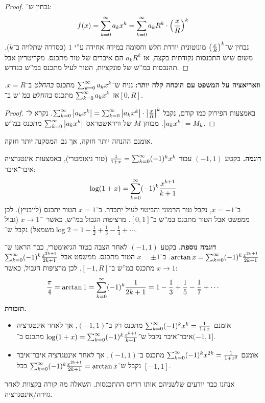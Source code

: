 \documentclass[]{../../../../tex/classes/styledArticle}
\begin{document}
	\begin{proof}
		נבחין ש־: 
		\[ f(x) = \sum_{k = 0}^{\infty} a_kx^{k} = \sum_{k = 0}^{\infty} a_kR^{k} \cdot \left ( \frac{x}{R} \right )^{k} \]
	נבחין ש־$\left ( \frac{x}{R} \right )^{k}$ מונוטונית יורדת חלש וחסומה במידה אחידה ע''י $1$ (כסדרה שתלויה ב־$k$). משום שיש התכנסות נקודתית בקצה, אז $a_kR^{k}$ הם איברים של טור מתכנס. מקריטריון אבל תהנכסות במ''ש של פונקציות, הטור לעיל מתכנס במ''ש כנדרש. 
	\end{proof}
	
	\textbf{וואריאציה על המשפט עם הוכחה קלה יותר: }נניח ש־$\sum_{k = 0}^{\infty} a_kx^{k}$ מתכנס \textit{בהחלט} ב־$x = R$. אז $\sum_{k = 0}^{\infty} a_kx^{k}$ מתכנס \textit{בהחלט במ'}'ש ב־$[0, R]$. \begin{proof}
		באמצעות הפירוק כמו קודם, נקבל $\sum_{k = 0}^{\infty} \left \lvert a_kx^{k} \right \rvert = \sum_{k = 0}^{\infty} \left \lvert a_kx^{k} \right \rvert \cdot \left \lvert \frac{x}{R} \right \rvert^{k}$.
		נקרא ל־$\left \lvert a_kx^{k} \right \rvert = M_k$. מבוחן $M$ של וויראשטראס $\sum_{k = 0}^{\infty} \left \lvert a_kx^{k} \right \rvert$ מתכנס במ''ש. 
	\end{proof}
	
	אומנם ההנחה יותר חזקה, אך גם המסקנה יותר חזקה. 
	
	\textbf{דוגמה. }בקטע $(-1, 1)$ עבור $\frac{1}{1 + x}  = \sum_{k = 0}^{\infty} (-1)^{k}x^{k}$ (טור גיאומטרי), באמצעות אינטגרציה איבר־איבר: 
	\[ \log(1 + x) = \sum_{k = 0}^{\infty} (-1)^{k}\frac{x^{k + 1}}{k + 1} \]
	ב־$x = -1$, נקבל טור הרמוני והביטוי לעיל יתבדר. ב־$x =1$ הטור יתכנס (לייבניץ). לכן ממפשט אבל הטור מתכנס במ''ש ב־$[0, 1]$. מרציפות הגבול במ''ש, כאשר $x \to 1^{-}$ (גבול משמאל) נקבל ש־$\log 2 = 1 - \frac{1}{2} + \frac{1}{3} - \frac{1}{4} + \cdots$. 
	
	\textbf{דוגמה נוספת. }בקטע $(-1 ,1)$ לאחר הצבה בטור הגיאומטרי, כבר הראנו ש־$\arctan x = \sum_{k = 0}^{\infty} (-1)^{k} \frac{x^{2k + 1}}{2k + 1}$. ב־$x = \pm 1$ הטור מתכנס. ממשפט אבל $\sum_{k = 0}^{\infty} (-1)^{k}\frac{x^{2k + 1}}{2k  +1}$ מתכנס במ''ש ב־$[-1, R]$. לכן מרציפות הגבול, כאשר $x \to 1$: 
	\[ \frac{\pi}{4} = \arctan 1 = \sum_{k = 0}^{\infty} (-1)^{k}\frac{1}{2k + 1} = 1 - \frac{1}{3} + \frac{1}{5} - \frac{1}{7} + \cdots \]
	\textbf{תזכורת. }
	\begin{itemize}
		\item אומנם $\sum_{k = 0}^{\infty} (-1)^{k}x^{k} = \frac{1}{1 + x}$ מתכנס רק ב־$(-1, 1)$, אך לאחר אינטגרציה איבר־איבר נקבל ש־$\log(1 +x) = \sum_{k = 0}^{\infty} (-1)^{k}\frac{x^{k + 1}}{k + 1}$ מתכנס ב־$(-1, 1]$. 
		\item אומנם $\sum_{k = 0}^{\infty} (-1)^{k}x^{2k} = \frac{1}{1 + x^{2}}$ מתכנס ב־$(-1, 1)$, אך לאחר אינטגרציה איבר־איבר נקבל ש־$\sum_{k = 0}^{\infty} (-1)^{k}\frac{x^{2k + 1}}{2k + 1} = \arctan x$ בכל $[-1, 1]$. 
	\end{itemize}
	אנחנו כבר יודעים שלשניהם אותו רדיוס ההתכנסות. השאלה מה קורה בקצוות לאחר גזירה/אינטגרציה. 
	
\end{document}
